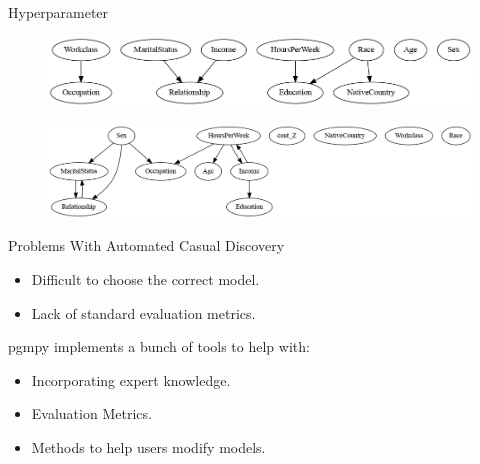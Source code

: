 \documentclass{beamer}
\begin{document}
% 
% 

\begin{frame}{Hyperparameter}
	\begin{figure}
		\centering
		\includegraphics[scale=0.4]{imgs/adult_x2.png}
	\end{figure}
	\begin{figure}
		\centering
		\includegraphics[scale=0.4]{imgs/adult_pillai.png}
	\end{figure}
\end{frame}

\begin{frame}{Problems With Automated Casual Discovery}
	\begin{itemize}
		\item Difficult to choose the correct model.
		\item Lack of standard evaluation metrics.
	\end{itemize}

	\vspace{2em}

	pgmpy implements a bunch of tools to help with:
	\begin{itemize}
		\item Incorporating expert knowledge.
		\item Evaluation Metrics.
		\item Methods to help users modify models.
	\end{itemize}
\end{frame}
\end{document}
